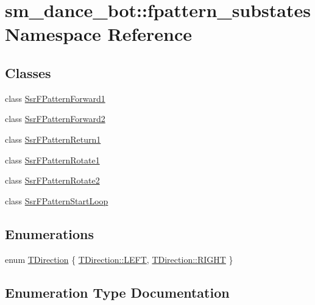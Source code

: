 \hypertarget{namespacesm__dance__bot_1_1fpattern__substates}{}\section{sm\+\_\+dance\+\_\+bot\+:\+:fpattern\+\_\+substates Namespace Reference}
\label{namespacesm__dance__bot_1_1fpattern__substates}
\subsection*{Classes}
\begin{DoxyCompactItemize}
\item 
class \hyperlink{structsm__dance__bot_1_1fpattern__substates_1_1SsrFPatternForward1}{Ssr\+F\+Pattern\+Forward1}
\item 
class \hyperlink{structsm__dance__bot_1_1fpattern__substates_1_1SsrFPatternForward2}{Ssr\+F\+Pattern\+Forward2}
\item 
class \hyperlink{structsm__dance__bot_1_1fpattern__substates_1_1SsrFPatternReturn1}{Ssr\+F\+Pattern\+Return1}
\item 
class \hyperlink{structsm__dance__bot_1_1fpattern__substates_1_1SsrFPatternRotate1}{Ssr\+F\+Pattern\+Rotate1}
\item 
class \hyperlink{structsm__dance__bot_1_1fpattern__substates_1_1SsrFPatternRotate2}{Ssr\+F\+Pattern\+Rotate2}
\item 
class \hyperlink{structsm__dance__bot_1_1fpattern__substates_1_1SsrFPatternStartLoop}{Ssr\+F\+Pattern\+Start\+Loop}
\end{DoxyCompactItemize}
\subsection*{Enumerations}
\begin{DoxyCompactItemize}
\item 
enum \hyperlink{namespacesm__dance__bot_1_1fpattern__substates_ab63ecbf877c9fb147693996d1dcdbd9f}{T\+Direction} \{ \hyperlink{namespacesm__dance__bot_1_1fpattern__substates_ab63ecbf877c9fb147693996d1dcdbd9fa684d325a7303f52e64011467ff5c5758}{T\+Direction\+::\+L\+E\+FT}, 
\hyperlink{namespacesm__dance__bot_1_1fpattern__substates_ab63ecbf877c9fb147693996d1dcdbd9fa21507b40c80068eda19865706fdc2403}{T\+Direction\+::\+R\+I\+G\+HT}
 \}
\end{DoxyCompactItemize}


\subsection{Enumeration Type Documentation}
